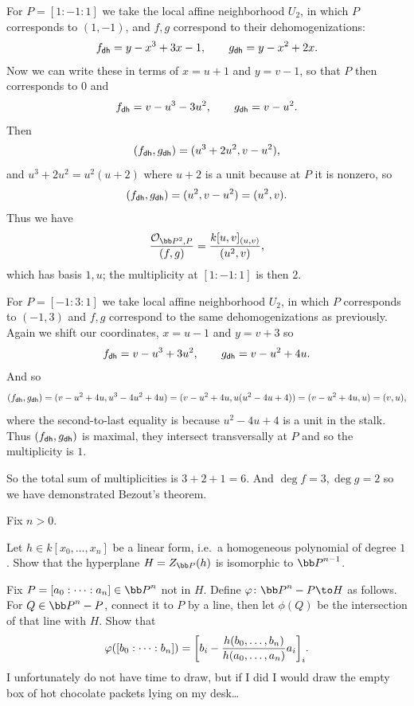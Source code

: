 For $P=[1:-1:1]$ we take the local affine neighborhood $U_2$, in which $P$ corresponds to $(1,-1)$, and $f,g$ correspond to their dehomogenizations:
$$ f_{\sf dh} = y - x^3 + 3x - 1,\qquad g_{\sf dh} = y - x^2 + 2x . $$
Now we can write these in terms of $x=u+1$ and $y=v-1$, so that $P$ then corresponds to $0$ and
$$ f_{\sf dh} = v - u^3 - 3u^2,\qquad g_{\sf dh} = v - u^2 . $$
Then
$$ (f_{\sf dh},g_{\sf dh}) = (u^3+2u^2,v-u^2) , $$
and $u^3+2u^2=u^2(u+2)$ where $u+2$ is a unit because at $P$ it is nonzero, so
$$ (f_{\sf dh},g_{\sf dh}) = (u^2,v-u^2) = (u^2,v) . $$
Thus we have
$$ \frac{\O_{\bP^2,P}}{(f,g)} = \frac{k[u,v]_{(u,v)}}{(u^2,v)} , $$
which has basis $1,u$; the multiplicity at $[1:-1:1]$ is then $2$.

For $P=[-1:3:1]$ we take local affine neighborhood $U_2$, in which $P$ corresponds to $(-1,3)$ and $f,g$ correspond to the same dehomogenizations as previously.
Again we shift our coordinates, $x=u-1$ and $y=v+3$ so
$$ f_{\sf dh} = v - u^3 + 3u^2,\qquad g_{\sf dh} = v - u^2 + 4u . $$
And so
$$ (f_{\sf dh},g_{\sf dh}) = (v - u^2 + 4u, u^3 - 4u^2 + 4u) = (v-u^2+4u,u(u^2-4u+4)) = (v-u^2+4u,u) = (v,u) , $$
where the second-to-last equality is because $u^2-4u+4$ is a unit in the stalk.
Thus $(f_{\sf dh},g_{\sf dh})$ is maximal, they intersect transversally at $P$ and so the multiplicity is $1$.

So the total sum of multiplicities is $3+2+1=6$.
And $\deg f=3,\deg g=2$ so we have demonstrated Bezout's theorem.

\bprob

    Fix $n>0$.
    \benum
        \item Let $h\in k[x_0,\dots,x_n]$ be a linear form, i.e.\ a homogeneous polynomial of degree $1$.
        Show that the hyperplane $H=Z_\bP(h)$ is isomorphic to $\bP^{n-1}$.

        \item Fix $P=[a_0:\cdots:a_n]\in\bP^n$ not in $H$.
        Define $\phi\colon\bP^n-P\to H$ as follows.
        For $Q\in\bP^n-P$, connect it to $P$ by a line, then let $\phi(Q)$ be the intersection of that line with $H$.
        Show that
        $$ \varphi([b_0:\cdots:b_n]) = \mathopen{}\mathclose{\left[b_i - {{h(b_0,\dots,b_n)}\over{h(a_0,\dots,a_n)}}a_i\right]}_i . $$
    \eenum
    I unfortunately do not have time to draw, but if I did I would draw the empty box of hot chocolate packets lying on my desk\dots

\eprob

